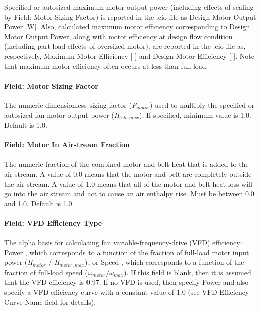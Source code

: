 Specified or autosized maximum motor output power (including effects of scaling by Field: Motor Sizing Factor) is reported in the .eio file as Design Motor Output Power {[}W{]}. Also, calculated maximum motor efficiency corresponding to Design Motor Output Power, along with motor efficiency at design flow condition (including part-load effects of oversized motor), are reported in the .eio file as, respectively, Maximum Motor Efficiency {[}-{]} and Design Motor Efficiency {[}-{]}. Note that maximum motor efficiency often occurs at less than full load.

\paragraph{Field: Motor Sizing Factor}\label{field-motor-sizing-factor}

The numeric dimensionless sizing factor (\emph{F\(_{motor}\)}) used to multiply the specified or autosized fan motor output power (\emph{H\(_{belt,max}\)}). If specified, minimum value is 1.0. Default is 1.0.

\paragraph{Field: Motor In Airstream Fraction}\label{field-motor-in-airstream-fraction-4}

The numeric fraction of the combined motor and belt heat that is added to the air stream. A value of 0.0 means that the motor and belt are completely outside the air stream. A value of 1.0 means that all of the motor and belt heat loss will go into the air stream and act to cause an air enthalpy rise. Must be between 0.0 and 1.0. Default is 1.0.

\paragraph{Field: VFD Efficiency Type}\label{field-vfd-efficiency-type}

The alpha basis for calculating fan variable-frequency-drive (VFD) efficiency: Power , which corresponds to a function of the fraction of full-load motor input power (\emph{H\(_{motor}\)} / \emph{H\(_{motor,max}\)}), or Speed , which corresponds to a function of the fraction of full-load speed (\(\omega_{motor} / \omega_{max}\)). If this field is blank, then it is assumed that the VFD efficiency is 0.97. If no VFD is used, then specify Power and also specify a VFD efficiency curve with a constant value of 1.0 (see VFD Efficiency Curve Name field for details).

